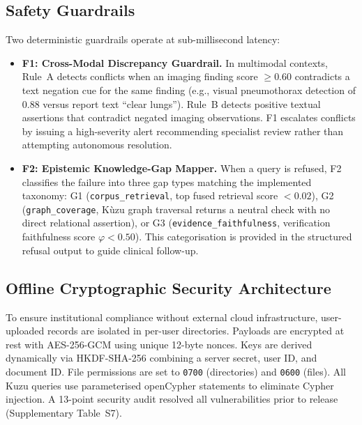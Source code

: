 \documentclass[preprint,12pt,a4paper]{elsarticle}
\begin{document}
\subsection{Safety Guardrails}
\label{sec:guardrails}

Two deterministic guardrails operate at sub-millisecond latency:
\begin{itemize}
  \item \textbf{F1: Cross-Modal Discrepancy Guardrail.} In multimodal contexts,
        Rule~A detects conflicts when an imaging finding score $\geq 0.60$ contradicts
        a text negation cue for the same finding (e.g., visual pneumothorax detection
        of 0.88 versus report text ``clear lungs''). Rule~B detects positive textual
        assertions that contradict negated imaging observations. F1 escalates conflicts
        by issuing a high-severity alert recommending specialist review rather than
        attempting autonomous resolution.
  \item \textbf{F2: Epistemic Knowledge-Gap Mapper.} When a query is refused, F2
        classifies the failure into three gap types matching the implemented taxonomy:
        G1 (\texttt{corpus\_retrieval}, top fused retrieval score $< 0.02$),
        G2 (\texttt{graph\_coverage}, Kùzu graph traversal returns a neutral check
        with no direct relational assertion), or G3 (\texttt{evidence\_faithfulness},
        verification faithfulness score $\varphi < 0.50$). This categorisation is
        provided in the structured refusal output to guide clinical follow-up.
\end{itemize}

\subsection{Offline Cryptographic Security Architecture}
\label{sec:security}

To ensure institutional compliance without external cloud infrastructure, user-uploaded
records are isolated in per-user directories. Payloads are encrypted at rest with
AES-256-GCM using unique 12-byte nonces. Keys are derived dynamically via HKDF-SHA-256
\citep{krawczyk2010hkdf} combining a server secret, user ID, and document ID. File
permissions are set to \texttt{0700} (directories) and \texttt{0600} (files). All Kuzu
queries use parameterised openCypher statements to eliminate Cypher injection. A
13-point security audit resolved all vulnerabilities prior to release (Supplementary
Table~S7).
\end{document}
